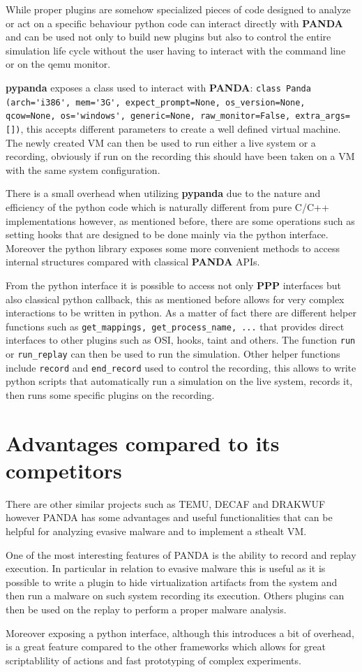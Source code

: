 While proper plugins are somehow specialized pieces of code designed to analyze or act on a specific behaviour python code can interact directly with \textbf{PANDA} and can be used not only to build new plugins but also to control the entire simulation life cycle without the user having to interact with the command line or on the qemu monitor.

\textbf{pypanda} exposes a class used to interact with \textbf{PANDA}: \lstinline{class Panda (arch='i386', mem='3G', expect_prompt=None, os_version=None, qcow=None, os='windows', generic=None, raw_monitor=False, extra_args=[])}, this accepts different parameters to create a well defined virtual machine. The newly created VM can then be used to run either a live system or a recording, obviously if run on the recording this should have been taken on a VM with the same system configuration. 

There is a small overhead when utilizing \textbf{pypanda} due to the nature and efficiency of the python code which is naturally different from pure C/C++ implementations however, as mentioned before, there are some operations such as setting hooks that are designed to be done mainly via the python interface. Moreover the python library exposes some more convenient methods to access internal structures compared with classical \textbf{PANDA} APIs. 

From the python interface it is possible to access not only \textbf{PPP} interfaces but also classical python callback, this as mentioned before allows for very complex interactions to be written in python. As a matter of fact there are different helper functions such as \lstinline{get_mappings, get_process_name, ...} that provides direct interfaces to other plugins such as OSI, hooks, taint and others. The function \lstinline{run} or \lstinline{run_replay} can then be used to run the simulation. Other helper functions include \lstinline{record} and \lstinline{end_record} used to control the recording, this allows to write python scripts that automatically run a simulation on the live system, records it, then runs some specific plugins on the recording. 

\section{Advantages compared to its competitors}
There are other similar projects such as TEMU, DECAF and DRAKWUF however PANDA has some advantages and useful functionalities that can be helpful for analyzing evasive malware and to implement a sthealt VM.

One of the most interesting features of PANDA is the ability to record and replay execution. In particular in relation to evasive malware this is useful as it is possible to write a plugin to hide virtualization artifacts from the system and then run a malware on such system recording its execution. Others plugins can then be used on the replay to perform a proper malware analysis. 

Moreover exposing a python interface, although this introduces a bit of overhead, is a great feature compared to the other frameworks which allows for great scriptablility of actions and fast prototyping of complex experiments.